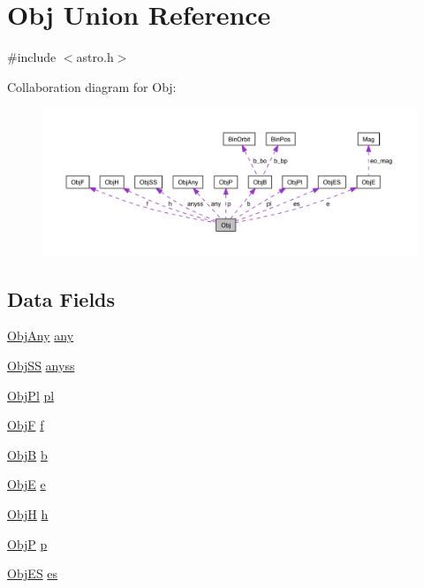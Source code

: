 \hypertarget{union_obj}{\section{Obj Union Reference}
\label{union_obj}
}


{\ttfamily \#include $<$astro.\-h$>$}



Collaboration diagram for Obj\-:
\nopagebreak
\begin{figure}[H]
\begin{center}
\leavevmode
\includegraphics[width=350pt]{union_obj__coll__graph}
\end{center}
\end{figure}
\subsection*{Data Fields}
\begin{DoxyCompactItemize}
\item 
\hyperlink{struct_obj_any}{Obj\-Any} \hyperlink{union_obj_a3be70e47b7e45f1e509c5cb14b0b78ff}{any}
\item 
\hyperlink{struct_obj_s_s}{Obj\-S\-S} \hyperlink{union_obj_aa005251ef147fd79203485f59d44839a}{anyss}
\item 
\hyperlink{struct_obj_pl}{Obj\-Pl} \hyperlink{union_obj_a85c3757106e1ff2302aa87006eebc31e}{pl}
\item 
\hyperlink{struct_obj_f}{Obj\-F} \hyperlink{union_obj_a208e4a5dfb78b3b3e667b481694b155c}{f}
\item 
\hyperlink{struct_obj_b}{Obj\-B} \hyperlink{union_obj_acb73b50da4a37f11692fc44ef563a227}{b}
\item 
\hyperlink{struct_obj_e}{Obj\-E} \hyperlink{union_obj_ad9cbacafcfa52192f9e810aadd170941}{e}
\item 
\hyperlink{struct_obj_h}{Obj\-H} \hyperlink{union_obj_abbef64a85f55d6aaff88d47e2a9dc883}{h}
\item 
\hyperlink{struct_obj_p}{Obj\-P} \hyperlink{union_obj_a698977a8ec8db73cf433246f32a1c88c}{p}
\item 
\hyperlink{struct_obj_e_s}{Obj\-E\-S} \hyperlink{union_obj_abde2a9cfca01fb66e841ab82e343b710}{es}
\end{DoxyCompactItemize}


